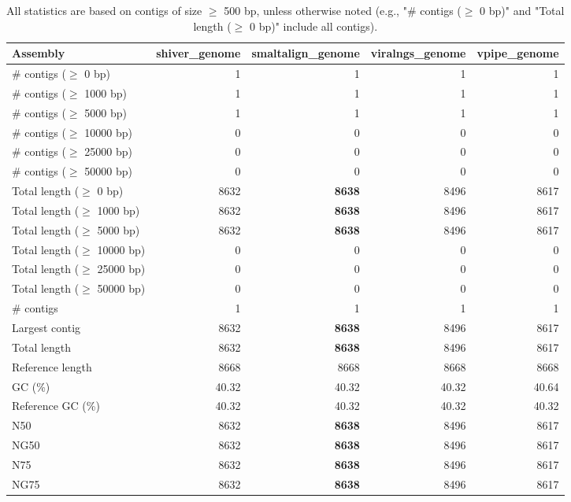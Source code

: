 \documentclass[12pt,a4paper]{article}
\begin{document}
\begin{table}[ht]
\begin{center}
\caption{All statistics are based on contigs of size $\geq$ 500 bp, unless otherwise noted (e.g., "\# contigs ($\geq$ 0 bp)" and "Total length ($\geq$ 0 bp)" include all contigs).}
\begin{tabular}{|l*{4}{|r}|}
\hline
Assembly & shiver\_genome & smaltalign\_genome & viralngs\_genome & vpipe\_genome \\ \hline
\# contigs ($\geq$ 0 bp) & 1 & 1 & 1 & 1 \\ \hline
\# contigs ($\geq$ 1000 bp) & 1 & 1 & 1 & 1 \\ \hline
\# contigs ($\geq$ 5000 bp) & 1 & 1 & 1 & 1 \\ \hline
\# contigs ($\geq$ 10000 bp) & 0 & 0 & 0 & 0 \\ \hline
\# contigs ($\geq$ 25000 bp) & 0 & 0 & 0 & 0 \\ \hline
\# contigs ($\geq$ 50000 bp) & 0 & 0 & 0 & 0 \\ \hline
Total length ($\geq$ 0 bp) & 8632 & {\bf 8638} & 8496 & 8617 \\ \hline
Total length ($\geq$ 1000 bp) & 8632 & {\bf 8638} & 8496 & 8617 \\ \hline
Total length ($\geq$ 5000 bp) & 8632 & {\bf 8638} & 8496 & 8617 \\ \hline
Total length ($\geq$ 10000 bp) & 0 & 0 & 0 & 0 \\ \hline
Total length ($\geq$ 25000 bp) & 0 & 0 & 0 & 0 \\ \hline
Total length ($\geq$ 50000 bp) & 0 & 0 & 0 & 0 \\ \hline
\# contigs & 1 & 1 & 1 & 1 \\ \hline
Largest contig & 8632 & {\bf 8638} & 8496 & 8617 \\ \hline
Total length & 8632 & {\bf 8638} & 8496 & 8617 \\ \hline
Reference length & 8668 & 8668 & 8668 & 8668 \\ \hline
GC (\%) & 40.32 & 40.32 & 40.32 & 40.64 \\ \hline
Reference GC (\%) & 40.32 & 40.32 & 40.32 & 40.32 \\ \hline
N50 & 8632 & {\bf 8638} & 8496 & 8617 \\ \hline
NG50 & 8632 & {\bf 8638} & 8496 & 8617 \\ \hline
N75 & 8632 & {\bf 8638} & 8496 & 8617 \\ \hline
NG75 & 8632 & {\bf 8638} & 8496 & 8617 \\ \hline

\end{tabular}
\end{center}
\end{table}
\end{document}
